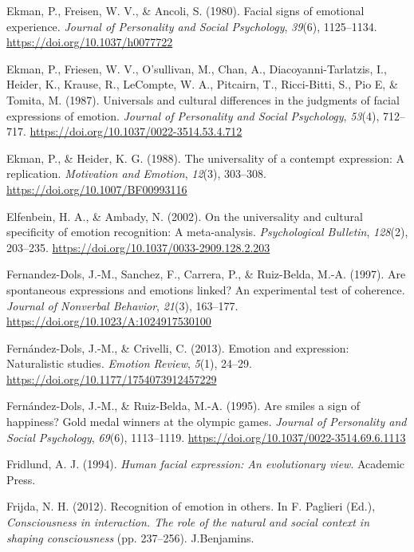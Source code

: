\documentclass[
  english,
  doc]{apa7}
\newlength{\cslhangindent}
\newenvironment{cslreferences}%
  {\setlength{\parindent}{0pt}%
  \everypar{\setlength{\hangindent}{\cslhangindent}}\ignorespaces}%
  {\par}
\begin{document}
\begin{cslreferences}
\leavevmode\hypertarget{ref-ekman1980facial}{}%
Ekman, P., Freisen, W. V., \& Ancoli, S. (1980). Facial signs of emotional experience. \emph{Journal of Personality and Social Psychology}, \emph{39}(6), 1125--1134. \url{https://doi.org/10.1037/h0077722}

\leavevmode\hypertarget{ref-ekman1987universals}{}%
Ekman, P., Friesen, W. V., O'sullivan, M., Chan, A., Diacoyanni-Tarlatzis, I., Heider, K., Krause, R., LeCompte, W. A., Pitcairn, T., Ricci-Bitti, S., Pio E, \& Tomita, M. (1987). Universals and cultural differences in the judgments of facial expressions of emotion. \emph{Journal of Personality and Social Psychology}, \emph{53}(4), 712--717. \url{https://doi.org/10.1037/0022-3514.53.4.712}

\leavevmode\hypertarget{ref-ekman1988universality}{}%
Ekman, P., \& Heider, K. G. (1988). The universality of a contempt expression: A replication. \emph{Motivation and Emotion}, \emph{12}(3), 303--308. \url{https://doi.org/10.1007/BF00993116}

\leavevmode\hypertarget{ref-elfenbein2002universality}{}%
Elfenbein, H. A., \& Ambady, N. (2002). On the universality and cultural specificity of emotion recognition: A meta-analysis. \emph{Psychological Bulletin}, \emph{128}(2), 203--235. \url{https://doi.org/10.1037/0033-2909.128.2.203}

\leavevmode\hypertarget{ref-fernandez1997spontaneous}{}%
Fernandez-Dols, J.-M., Sanchez, F., Carrera, P., \& Ruiz-Belda, M.-A. (1997). Are spontaneous expressions and emotions linked? An experimental test of coherence. \emph{Journal of Nonverbal Behavior}, \emph{21}(3), 163--177. \url{https://doi.org/10.1023/A:1024917530100}

\leavevmode\hypertarget{ref-fernandez2013emotion}{}%
Fernández-Dols, J.-M., \& Crivelli, C. (2013). Emotion and expression: Naturalistic studies. \emph{Emotion Review}, \emph{5}(1), 24--29. \url{https://doi.org/10.1177/1754073912457229}

\leavevmode\hypertarget{ref-fernandez1995smiles}{}%
Fernández-Dols, J.-M., \& Ruiz-Belda, M.-A. (1995). Are smiles a sign of happiness? Gold medal winners at the olympic games. \emph{Journal of Personality and Social Psychology}, \emph{69}(6), 1113--1119. \url{https://doi.org/10.1037/0022-3514.69.6.1113}

\leavevmode\hypertarget{ref-fridlund1994human}{}%
Fridlund, A. J. (1994). \emph{Human facial expression: An evolutionary view}. Academic Press.

\leavevmode\hypertarget{ref-frijda2012recognition}{}%
Frijda, N. H. (2012). Recognition of emotion in others. In F. Paglieri (Ed.), \emph{Consciousness in interaction. The role of the natural and social context in shaping consciousness} (pp. 237--256). J.Benjamins.


\end{cslreferences}
\end{document}
